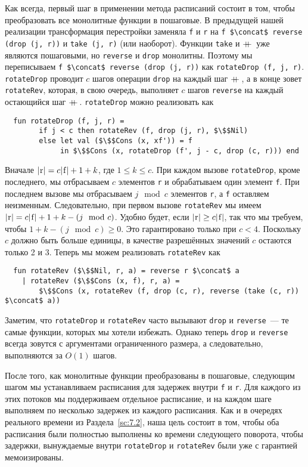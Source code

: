 Как всегда, первый шаг в применении метода расписаний состоит в том,
чтобы преобразовать все монолитные функции в пошаговые. В предыдущей
нашей реализации трансформация перестройки заменяла \lstinline!f! и
\lstinline!r! на 
\lstinline!f $\concat$ reverse (drop (j, r))! и 
\lstinline!take (j, r)! (или наоборот). Функции \lstinline!take! и
$+\!\!\!+\,$ уже являются пошаговыми, но \lstinline!reverse! и
\lstinline!drop! монолитны. Поэтому мы переписываем
\lstinline!f $\concat$ reverse (drop (j, r))! как 
\lstinline!rotateDrop (f, j, r)!. \lstinline!rotateDrop! проводит $c$
шагов операции \lstinline!drop! на каждый шаг $+\!\!\!+\,$, а в конце
зовет \lstinline!rotateRev!, которая, в свою очередь, выполняет $c$
шагов \lstinline!reverse! на каждый остающийся шаг
$+\!\!\!+\,$. \lstinline!rotateDrop! можно реализовать как
\begin{lstlisting}
  fun rotateDrop (f, j, r) =
        if j < c then rotateRev (f, drop (j, r), $\$$Nil)
        else let val ($\$$Cons (x, xf')) = f
             in $\$$Cons (x, rotateDrop (f', j - c, drop (c, r))) end
\end{lstlisting}
Вначале $|\lstinline!r!| = c|\lstinline!f!| + 1 + k$, где $1 \le k \le
c$. При каждом вызове \lstinline!rotateDrop!, кроме последнего, мы отбрасываем $c$
элементов \lstinline!r! и обрабатываем один элемент \lstinline!f!. При
последнем вызове мы отбрасываем $j \mod c$ элементов \lstinline!r!, а
\lstinline!f! оставляем неизменным. Следовательно, при первом вызове
\lstinline!rotateRev! мы имеем $|\lstinline!r!| = c|\lstinline!f!| + 1
+ k - (j \mod c)$. Удобно будет, если $|\lstinline!r!|
\ge c|\lstinline!f!|$, так что мы требуем, чтобы $1 + k - (j \mod c)
\ge 0$. Это гарантировано только при $c < 4$. Поскольку $c$ должно
быть больше единицы, в качестве разрешённых значений $c$ остаются
только 2 и 3. Теперь мы можем реализовать \lstinline!rotateRev! как
\begin{lstlisting}
  fun rotateRev ($\$$Nil, r, a) = reverse r $\concat$ a
    | rotateRev ($\$$Cons (x, f), r, a) =
        $\$$Cons (x, rotateRev (f, drop (c, r), reverse (take (c, r)) $\concat$ a))
\end{lstlisting}
Заметим, что \lstinline!rotateDrop! и \lstinline!rotateRev! часто
вызывают \lstinline!drop! и \lstinline!reverse!~--- те самые функции,
которых мы хотели избежать. Однако теперь \lstinline!drop! и
\lstinline!reverse! всегда зовутся с аргументами ограниченного
размера, а следовательно, выполняются за $O(1)$ шагов.

После того, как монолитные функции преобразованы в пошаговые,
следующим шагом мы устанавливаем расписания для задержек внутри
\lstinline!f! и \lstinline!r!. Для каждого из этих потоков мы
поддерживаем отдельное расписание, и на каждом шаге выполняем по
несколько задержек из каждого расписания. Как и в очередях реального
времени из Раздела~\ref{sc:7.2}, наша цель состоит в том, чтобы оба
расписания были полностью выполнены ко времени следующего поворота,
чтобы задержки, вынуждаемые внутри \lstinline!rotateDrop! и
\lstinline!rotateRev! были уже с гарантией мемоизированы.

